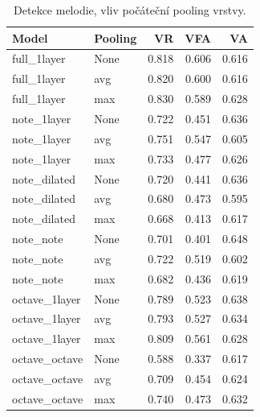 \begin{table}[h!]
\centering
    \begin{tabular}{llrrr}
    \toprule
            Model & Pooling &    VR &   VFA &    VA \\
    \midrule
    full\_1layer &    None & 0.818 & 0.606 & 0.616 \\
    full\_1layer &     avg & 0.820 & 0.600 & 0.616 \\
    full\_1layer &     max & 0.830 & 0.589 & 0.628 \\
    note\_1layer &    None & 0.722 & 0.451 & 0.636 \\
    note\_1layer &     avg & 0.751 & 0.547 & 0.605 \\
    note\_1layer &     max & 0.733 & 0.477 & 0.626 \\
    note\_dilated &    None & 0.720 & 0.441 & 0.636 \\
    note\_dilated &     avg & 0.680 & 0.473 & 0.595 \\
    note\_dilated &     max & 0.668 & 0.413 & 0.617 \\
        note\_note &    None & 0.701 & 0.401 & 0.648 \\
        note\_note &     avg & 0.722 & 0.519 & 0.602 \\
        note\_note &     max & 0.682 & 0.436 & 0.619 \\
    octave\_1layer &    None & 0.789 & 0.523 & 0.638 \\
    octave\_1layer &     avg & 0.793 & 0.527 & 0.634 \\
    octave\_1layer &     max & 0.809 & 0.561 & 0.628 \\
    octave\_octave &    None & 0.588 & 0.337 & 0.617 \\
    octave\_octave &     avg & 0.709 & 0.454 & 0.624 \\
    octave\_octave &     max & 0.740 & 0.473 & 0.632 \\
    \bottomrule
    \end{tabular}
\caption{Detekce melodie, vliv počáteční pooling vrstvy.}\label{tab:voicing_pooling}
\end{table}


